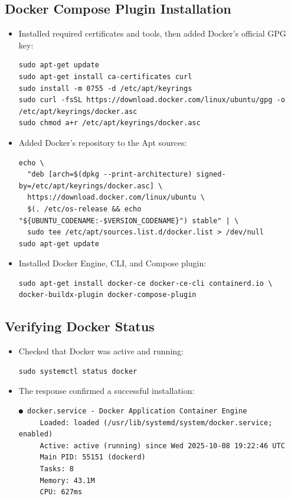 \subsection{Docker Compose Plugin Installation}
\begin{itemize}
    \item Installed required certificates and tools, then added Docker’s official GPG key:
\begin{verbatim}
sudo apt-get update
sudo apt-get install ca-certificates curl
sudo install -m 0755 -d /etc/apt/keyrings
sudo curl -fsSL https://download.docker.com/linux/ubuntu/gpg -o /etc/apt/keyrings/docker.asc
sudo chmod a+r /etc/apt/keyrings/docker.asc
\end{verbatim}

    \item Added Docker’s repository to the Apt sources:
\begin{verbatim}
echo \
  "deb [arch=$(dpkg --print-architecture) signed-by=/etc/apt/keyrings/docker.asc] \
  https://download.docker.com/linux/ubuntu \
  $(. /etc/os-release && echo "${UBUNTU_CODENAME:-$VERSION_CODENAME}") stable" | \
  sudo tee /etc/apt/sources.list.d/docker.list > /dev/null
sudo apt-get update
\end{verbatim}

    \item Installed Docker Engine, CLI, and Compose plugin:
\begin{verbatim}
sudo apt-get install docker-ce docker-ce-cli containerd.io \
docker-buildx-plugin docker-compose-plugin
\end{verbatim}
\end{itemize}

\subsection{Verifying Docker Status}
\begin{itemize}
    \item Checked that Docker was active and running:
\begin{verbatim}
sudo systemctl status docker
\end{verbatim}

    \item The response confirmed a successful installation:
\begin{verbatim}
● docker.service - Docker Application Container Engine
     Loaded: loaded (/usr/lib/systemd/system/docker.service; enabled)
     Active: active (running) since Wed 2025-10-08 19:22:46 UTC
     Main PID: 55151 (dockerd)
     Tasks: 8
     Memory: 43.1M
     CPU: 627ms
\end{verbatim}
\end{itemize}

